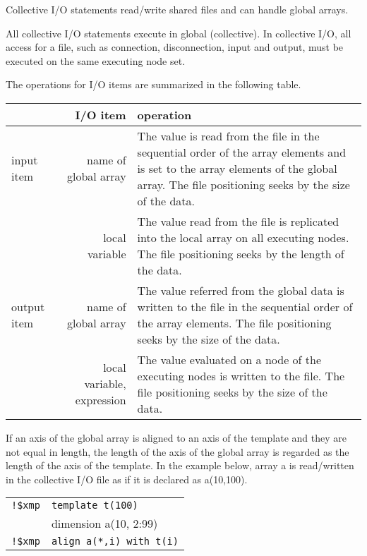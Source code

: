    Collective I/O statements read/write shared files and can handle global arrays.

   All collective I/O statements execute in global (collective).
   In collective I/O, all access for a file, such as connection, disconnection,
   input and output, must be executed on the same executing node set. 
   
   The operations for I/O items are summarized in the following table.

   \begin{table}[h]
    \begin{center}
     \begin{tabular}{|l|r|p{80mm}|}
      \hline
      \multicolumn{1}{|c}{ }  & {\bf I/O item} & {\bf operation} \\ \hline
      input item & name of global array & The value is read from the file in the sequential order of the array elements and is set to the array elements of the global array.
      The file positioning seeks by the size of the data.
      \\
      \cline{2-3}
      & local variable &  The value read from the file is replicated into the
	      local array on all executing nodes. The file positioning seeks by
	      the length of the data. \\ \hline
      output item & name of global array & The value referred from the global data 
	      is written to the file in the sequential order of the array elements.
	      The file positioning seeks by the size of the data. \\
      \cline{2-3}
      & local variable, expression & The value evaluated on a node of the executing nodes is written to the file.
      The file positioning seeks by the size of the data. \\ \hline
      \end{tabular}
     \end{center}
    \label{tb:aaa}
   \end{table}

   If an axis of the global array is aligned to an axis of the template and they are not equal in length, the length of the axis of the global array is regarded as the length of the axis of the template. In the example below, array a is read/written in the collective I/O file as if it is declared as a(10,100).\\
   \begin{tabular}{ll}
     \verb|!$xmp| & \verb|template t(100)| \\
     & dimension a(10, 2:99) \\
     \verb|!$xmp| & \verb|align a(*,i) with t(i)| \\
   \end{tabular}

